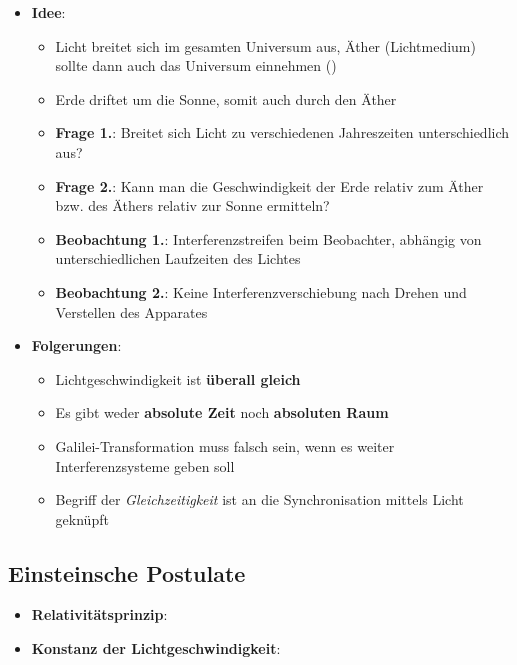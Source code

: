 \begin{itemize}
	\item \textbf{Idee}:
	\begin{itemize}
		\item Licht breitet sich im gesamten Universum aus, Äther (Lichtmedium) sollte dann auch das Universum einnehmen ()
		\item Erde driftet um die Sonne, somit auch durch den Äther
		\item \textbf{Frage 1.}: Breitet sich Licht zu verschiedenen Jahreszeiten unterschiedlich aus?
		\item \textbf{Frage 2.}: Kann man die Geschwindigkeit der Erde relativ zum Äther bzw. des Äthers relativ zur Sonne ermitteln?
		\item \textbf{Beobachtung 1.}: Interferenzstreifen beim Beobachter, abhängig von unterschiedlichen Laufzeiten des Lichtes
		\item \textbf{Beobachtung 2.}: Keine Interferenzverschiebung nach Drehen und Verstellen des Apparates
	\end{itemize}
	\item \textbf{Folgerungen}:
	\begin{itemize}
		\item Lichtgeschwindigkeit ist \textbf{überall gleich}
		\item Es gibt weder \textbf{absolute Zeit} noch \textbf{absoluten Raum}
		\item Galilei-Transformation muss falsch sein, wenn es weiter Interferenzsysteme geben soll
		\item Begriff der \textit{Gleichzeitigkeit} ist an die Synchronisation mittels Licht geknüpft
	\end{itemize}
\end{itemize}

\subsection{Einsteinsche Postulate}%
\label{srel:sub:einsteinsche_postulate}

\begin{itemize}
	\item \textbf{Relativitätsprinzip}: 
	\item \textbf{Konstanz der Lichtgeschwindigkeit}: 
\end{itemize}

